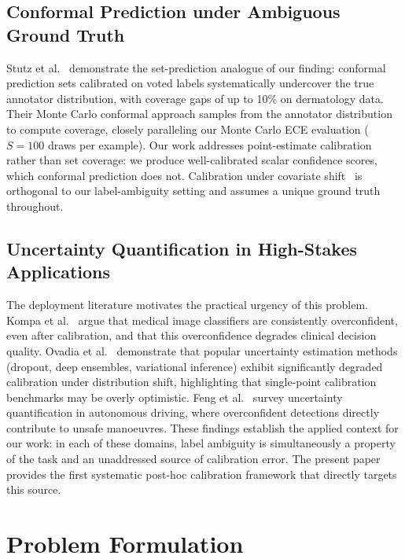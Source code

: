 \documentclass[10pt,journal,compsoc]{IEEEtran}
\begin{document}
\subsection{Conformal Prediction under Ambiguous Ground Truth}
Stutz et al.~\cite{stutz2023conformal} demonstrate the set-prediction analogue of our finding: conformal prediction sets calibrated on voted labels systematically undercover the true annotator distribution, with coverage gaps of up to 10\% on dermatology data.  Their Monte Carlo conformal approach samples from the annotator distribution to compute coverage, closely paralleling our Monte Carlo ECE evaluation ($S=100$ draws per example).  Our work addresses point-estimate calibration rather than set coverage: we produce well-calibrated scalar confidence scores, which conformal prediction does not.  Calibration under covariate shift~\cite{park2020calibrated,wang2020transferable} is orthogonal to our label-ambiguity setting and assumes a unique ground truth throughout.

\subsection{Uncertainty Quantification in High-Stakes Applications}
The deployment literature motivates the practical urgency of this problem.  Kompa et al.~\cite{kompa2021second} argue that medical image classifiers are consistently overconfident, even after calibration, and that this overconfidence degrades clinical decision quality.  Ovadia et al.~\cite{ovadia2019trust} demonstrate that popular uncertainty estimation methods (dropout, deep ensembles, variational inference) exhibit significantly degraded calibration under distribution shift, highlighting that single-point calibration benchmarks may be overly optimistic.  Feng et al.~\cite{feng2022review} survey uncertainty quantification in autonomous driving, where overconfident detections directly contribute to unsafe manoeuvres.  These findings establish the applied context for our work: in each of these domains, label ambiguity is simultaneously a property of the task and an unaddressed source of calibration error.  The present paper provides the first systematic post-hoc calibration framework that directly targets this source.

\section{Problem Formulation}
\label{sec:problem}
\end{document}
